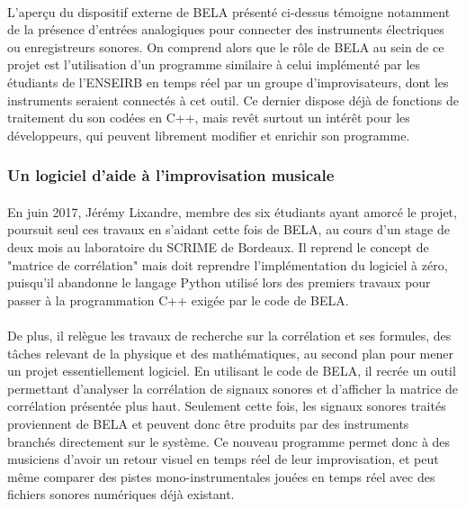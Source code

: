 \paragraph{}
L'aperçu du dispositif externe de BELA présenté ci-dessus témoigne
notamment de la présence d'entrées analogiques pour connecter des
instruments électriques ou enregistreurs sonores. On comprend alors
que le rôle de BELA au sein de ce projet est l'utilisation d'un
programme similaire à celui implémenté par les étudiants de l'ENSEIRB
en temps réel par un groupe d'improvisateurs, dont les instruments
seraient connectés à cet outil. Ce dernier dispose déjà de fonctions
de traitement du son codées en C++, mais revêt surtout un intérêt pour
les développeurs, qui peuvent librement modifier et enrichir son
programme.

\subsubsection{Un logiciel d'aide à l'improvisation musicale}
\paragraph{}
En juin 2017, Jérémy Lixandre, membre des six étudiants ayant amorcé
le projet, poursuit seul ces travaux en s'aidant cette fois de BELA,
au cours d'un stage de deux mois au laboratoire du SCRIME de
Bordeaux. Il reprend le concept de "matrice de corrélation" mais
doit reprendre l'implémentation du logiciel à zéro, puisqu'il
abandonne le langage Python utilisé lors des premiers travaux pour
passer à la programmation C++ exigée par le code de BELA.
\paragraph{}
De plus, il relègue les travaux de recherche sur la corrélation et ses
formules, des tâches relevant de la physique et des mathématiques, au
second plan pour mener un projet essentiellement logiciel. En
utilisant le code de BELA, il recrée un outil permettant d'analyser la
corrélation de signaux sonores et d'afficher la matrice de corrélation
présentée plus haut. Seulement cette fois, les signaux sonores traités
proviennent de BELA et peuvent donc être produits par des instruments
branchés directement sur le système. Ce nouveau programme permet donc
à des musiciens d'avoir un retour visuel en temps réel de leur
improvisation, et peut même comparer des pistes mono-instrumentales
jouées en temps réel avec des fichiers sonores numériques déjà
existant.


